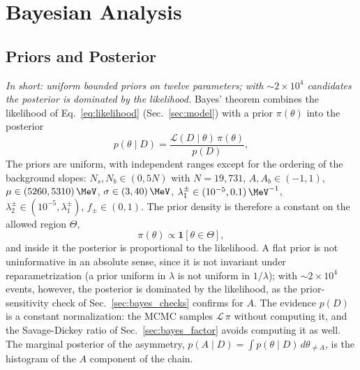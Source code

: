 \section{Bayesian Analysis}
\label{sec:bayesian}

\subsection{Priors and Posterior}
\label{sec:bayes_prior}
\emph{In short: uniform bounded priors on twelve parameters; with $\sim2\times10^4$ candidates the posterior is dominated by the likelihood.}
Bayes' theorem combines the likelihood of Eq.~\eqref{eq:likelihood} (Sec.~\ref{sec:model}) with a prior $\pi(\theta)$ into the posterior
\begin{equation}
p(\theta\mid D)=\frac{\mathcal{L}(D\mid\theta)\,\pi(\theta)}{p(D)},
\label{eq:bayes}
\end{equation}
The priors are uniform, with independent ranges except for the ordering of the background slopes: $N_s,N_b\in(0,5N)$ with $N=19{,}731$, $A,A_b\in(-1,1)$, $\mu\in(5260,5310)\,\MeV$, $\sigma\in(3,40)\,\MeV$, $\lambda_1^{\pm}\in(10^{-5},0.1)\,\MeV^{-1}$, $\lambda_2^{\pm}\in(10^{-5},\lambda_1^{\pm})$, $f_{\pm}\in(0,1)$. The prior density is therefore a constant on the allowed region $\Theta$,
\begin{equation}
\pi(\theta)\propto\mathbf{1}\left[\theta\in\Theta\right],
\label{eq:prior}
\end{equation}
and inside it the posterior is proportional to the likelihood. A flat prior is not uninformative in an absolute sense, since it is not invariant under reparametrization (a prior uniform in $\lambda$ is not uniform in $1/\lambda$); with $\sim$$2\times10^4$ events, however, the posterior is dominated by the likelihood, as the prior-sensitivity check of Sec.~\ref{sec:bayes_checks} confirms for $A$. The evidence $p(D)$ is a constant normalization: the MCMC samples $\mathcal{L}\,\pi$ without computing it, and the Savage-Dickey ratio of Sec.~\ref{sec:bayes_factor} avoids computing it as well. The marginal posterior of the asymmetry, $p(A\mid D)=\int p(\theta\mid D)\,d\theta_{\neq A}$, is the histogram of the $A$ component of the chain.

